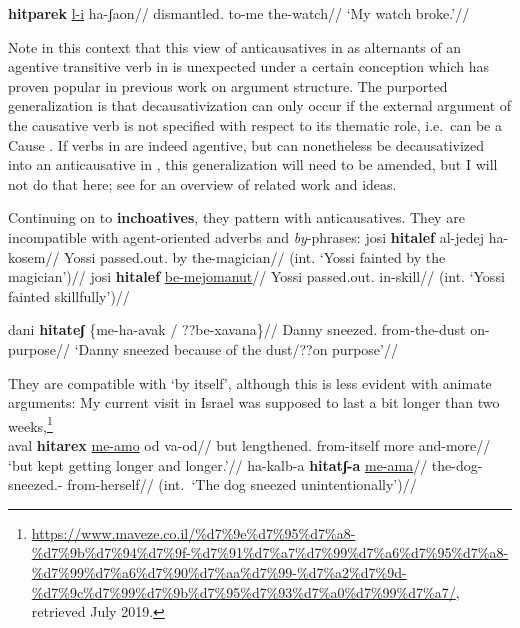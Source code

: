\ex
\begingl
\gla \textbf{hitparek} \underline{l-i} ha-ʃaon//
\glb dismantled. to-me the-watch//
\glft `My watch broke.'//
\endgl
\xe

Note in this context that this view of anticausatives in {\thit} as alternants of an agentive transitive verb in {\tpie} is unexpected under a certain conception which has proven popular in previous work on argument structure. The purported generalization is that decausativization can only occur if the external argument of the causative verb is not specified with respect to its thematic role, i.e.~can be a Cause \citep{unaccusativity95,reinhart02}. If verbs in {\tpie} are indeed agentive, but can nonetheless be decausativized into an anticausative in {\thit}, this generalization will need to be amended, but I will not do that here; see \citet[52]{layering15} for an overview of related work and ideas.


Continuing on to \textbf{inchoatives}, they pattern with anticausatives. They are incompatible with agent-oriented adverbs and \emph{by}-phrases:
\pex
		\a \ljudge{*} \begingl
			\gla josi \textbf{hitalef} al-jedej ha-kosem//
			\glb Yossi passed.out. by the-magician//
			\glft (int. `Yossi fainted by the magician')//
		\endgl
		\a {} \begingl
			\gla josi \textbf{hitalef} \underline{be-mejomanut}//
			\glb Yossi passed.out. in-skill//
			\glft (int. `Yossi fainted skillfully')//
		\endgl
\xe

\pex 
	\a \label{ex:incho1} \begingl
	\gla dani \textbf{hitateʃ} \{me-ha-avak / ??be-xavana\}//
	\glb Danny sneezed. \phantom{\{}from-the-dust {} \phantom{??}on-purpose//
	\glft `Danny sneezed because of the dust/??on purpose'//
	\endgl
\xe

They are compatible with `by itself', although this is less evident with animate arguments:
\pex \label{ex:thit-inch-byitself}
	\a My current visit in Israel was supposed to last a bit longer than two weeks,\footnote{
		\url{https://www.maveze.co.il/\%d7\%9e\%d7\%95\%d7\%a8-\%d7\%9b\%d7\%94\%d7\%9f-\%d7\%91\%d7\%a7\%d7\%99\%d7\%a6\%d7\%95\%d7\%a8-\%d7\%99\%d7\%a6\%d7\%90\%d7\%aa\%d7\%99-\%d7\%a2\%d7\%9d-\%d7\%9c\%d7\%99\%d7\%9b\%d7\%95\%d7\%93\%d7\%a0\%d7\%99\%d7\%a7/}, retrieved July 2019.}\\
		\begingl
			\gla aval \textbf{hitarex} \underline{me-a{\ts}mo} od va-od//
			\glb but lengthened. from-itself more and-more//
			\glft `but kept getting longer and longer.'//
		\endgl
	\a {}
		\begingl
			\gla ha-kalb-a \textbf{hitatʃ-a} \underline{me-a{\ts}ma}//
			\glb the-dog- sneezed.- from-herself//
			\glft (int.~`The dog sneezed unintentionally')//
		\endgl
\xe

